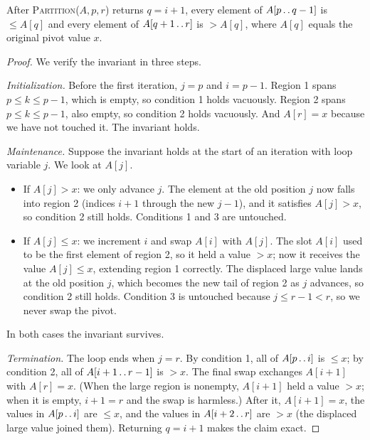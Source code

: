 \begin{lemma}
\label{ch07:lomuto-correct}
After \textsc{Partition}($A,p,r$) returns $q = i+1$, every element of
$A[p \mathinner{\ldotp\ldotp} q-1]$ is $\le A[q]$ and every element of $A[q+1 \mathinner{\ldotp\ldotp} r]$ is $> A[q]$,
where $A[q]$ equals the original pivot value $x$.
\end{lemma}

\begin{proof}
We verify the invariant in three steps.

\emph{Initialization.} Before the first iteration, $j = p$ and $i = p-1$.
Region 1 spans $p \le k \le p-1$, which is empty, so condition 1 holds vacuously.
Region 2 spans $p \le k \le p-1$, also empty, so condition 2 holds vacuously.
And $A[r] = x$ because we have not touched it. The invariant holds.

\emph{Maintenance.} Suppose the invariant holds at the start of an iteration with
loop variable $j$. We look at $A[j]$.
\begin{itemize}
\item If $A[j] > x$: we only advance $j$. The element at the old
position $j$ now falls into region 2 (indices $i+1$ through the new $j-1$), and
it satisfies $A[j] > x$, so condition 2 still holds. Conditions 1 and 3 are
untouched.
\item If $A[j] \le x$: we increment $i$ and swap $A[i]$ with $A[j]$. The slot
$A[i]$ used to be the first element of region 2, so it held a value $> x$; now it
receives the value $A[j] \le x$, extending region 1 correctly. The displaced
large value lands at the old position $j$, which becomes the new tail of region
2 as $j$ advances, so condition 2 still holds. Condition 3 is untouched because
$j \le r-1 < r$, so we never swap the pivot.
\end{itemize}
In both cases the invariant survives.

\emph{Termination.} The loop ends when $j = r$. By condition 1, all of
$A[p \mathinner{\ldotp\ldotp} i]$ is $\le x$; by condition 2, all of $A[i+1 \mathinner{\ldotp\ldotp} r-1]$ is $> x$.
The final swap exchanges $A[i+1]$ with $A[r] = x$. (When the large region is
nonempty, $A[i+1]$ held a value $> x$; when it is empty, $i+1 = r$ and the swap
is harmless.) After it, $A[i+1] = x$, the values in
$A[p \mathinner{\ldotp\ldotp} i]$ are $\le x$, and the values in $A[i+2 \mathinner{\ldotp\ldotp} r]$ are $> x$ (the
displaced large value joined them). Returning $q = i+1$ makes the claim exact.
\end{proof}

